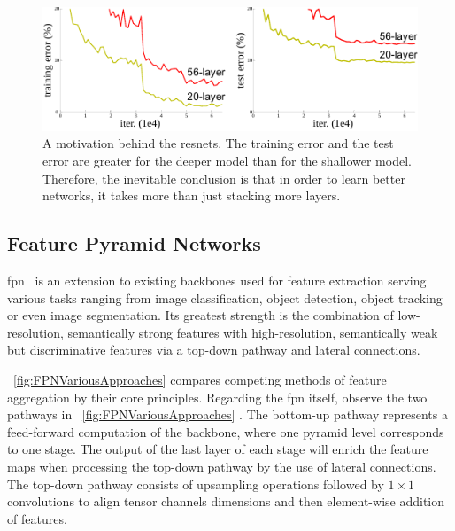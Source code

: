 \begin{figure}[t]
    \centerline{\includegraphics[width=0.8\linewidth]{figures/theoretical_foundations/resnet_motivation.pdf}}
    \caption[\gls{resnet} motivation]{A motivation behind the \glspl{resnet}. The training error and the test error are greater for the deeper model than for the shallower model. Therefore, the inevitable conclusion is that in order to learn better networks, it takes more than just stacking more layers. }
    \label{fig:ResnetMotivation}
\end{figure}

\subsection{Feature Pyramid Networks}
\label{ssec:FeaturePyramidNetworks}


\gls{fpn}~\cite{lin2017fpn} is an extension to existing backbones used for feature extraction serving various tasks ranging from image classification, object detection, object tracking or even image segmentation. Its greatest strength is the combination of low-resolution, semantically strong features with high-resolution, semantically weak but discriminative features via a top-down pathway and lateral connections.

\figtext{}~\ref{fig:FPNVariousApproaches} compares competing methods of feature aggregation by their core principles. Regarding the \gls{fpn} itself, observe the two pathways in \figtext{}~\ref{fig:FPNVariousApproaches} . The bottom-up pathway represents a feed-forward computation of the backbone, where one pyramid level corresponds to one stage. The output of the last layer of each stage will enrich the feature maps when processing the top-down pathway by the use of lateral connections. The top-down pathway consists of upsampling operations followed by $1 \times 1$ convolutions to align tensor channels dimensions and then element-wise addition of features.


